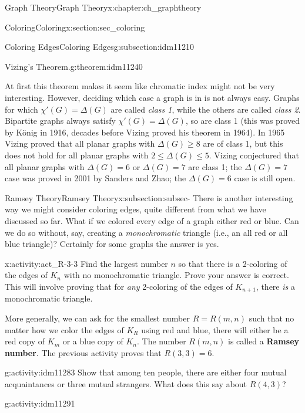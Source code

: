 \documentclass[oneside,10pt,]{book}
\newcommand{\terminology}[1]{\textbf{#1}}
\numberwithin{equation}{chapter}
\begin{document}
\begin{chapterptx}{Graph Theory}{}{Graph Theory}{}{}{x:chapter:ch_graphtheory}
\begin{sectionptx}{Coloring}{}{Coloring}{}{}{x:section:sec_coloring}
\begin{subsectionptx}{Coloring Edges}{}{Coloring Edges}{}{}{g:subsection:idm11210}
\begin{theorem}{Vizing's Theorem.}{}{g:theorem:idm11240}
\end{theorem}
At first this theorem makes it seem like chromatic index might not be very interesting. However, deciding which case a graph is in is not always easy. Graphs for which \(\chi'(G) = \Delta(G)\) are called \emph{class 1}, while the others are called \emph{class 2}. Bipartite graphs always satisfy \(\chi'(G) = \Delta(G)\), so are class 1 (this was proved by König in 1916, decades before Vizing proved his theorem in 1964). In 1965 Vizing proved that all planar graphs with \(\Delta(G) \ge 8\) are of class 1, but this does not hold for all planar graphs with \(2 \le \Delta(G) \le 5\). Vizing conjectured that all planar graphs with \(\Delta(G) = 6\) or \(\Delta(G) = 7\) are class 1; the \(\Delta(G) = 7\) case was proved in 2001 by Sanders and Zhao; the \(\Delta(G) = 6\) case is still open.%
\end{subsectionptx}
%
%
\typeout{************************************************}
\typeout{************************************************}
%
\begin{subsectionptx}{Ramsey Theory}{}{Ramsey Theory}{}{}{x:subsection:subsec-}
There is another interesting way we might consider coloring edges, quite different from what we have discussed so far. What if we colored every edge of a graph either red or blue. Can we do so without, say, creating a \emph{monochromatic} triangle (i.e., an all red or all blue triangle)? Certainly for some graphs the answer is yes.%
\begin{activity}{}{x:activity:act_R-3-3}%
Find the largest number \(n\) so that there is a 2-coloring of the edges of \(K_n\) with no monochromatic triangle.  Prove your answer is correct.  This will involve proving that for \emph{any} 2-coloring of the edges of \(K_{n+1}\), there \emph{is} a monochromatic triangle.%
\end{activity}
More generally, we can ask for the smallest number \(R = R(m,n)\) such that no matter how we color the edges of \(K_R\) using red and blue, there will either be a red copy of \(K_m\) or a blue copy of \(K_n\).  The number \(R(m,n)\) is called a \terminology{Ramsey number}.  The previous activity proves that \(R(3,3) = 6\).%
\begin{activity}{}{g:activity:idm11283}%
Show that among ten people, there are either four mutual acquaintances or three mutual strangers.  What does this say about \(R(4,3)\)?%
\end{activity}
\begin{activity}{}{g:activity:idm11291}%

\end{activity}
\end{subsectionptx}
\end{sectionptx}
\end{chapterptx}
\end{document}
